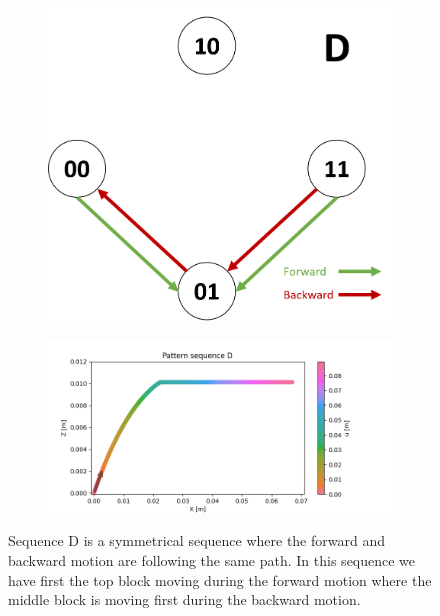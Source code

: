     \begin{figure}[h]
        \centering
        \begin{subfigure}{.2\textwidth}
        \includegraphics[width=\textwidth]{images/S_D.png}
        \end{subfigure}%
        \begin{subfigure}{.6\textwidth}
        \includegraphics[width=\textwidth]{images/D.png}
        \end{subfigure}
        \caption{Sequence D is a symmetrical sequence where the forward and backward motion are following the same path. In this sequence we have first the top block moving during the forward motion where the middle block is moving first during the backward motion.}
        \label{fig:appendix_seq_D}
    \end{figure}
    
